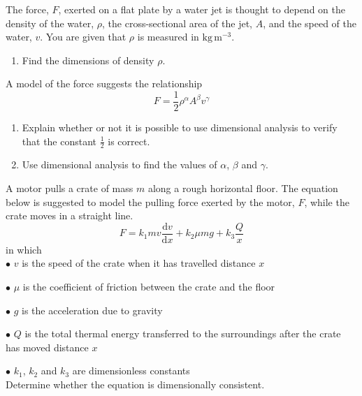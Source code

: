 \documentclass[leqno]{article}
\begin{document}
\begin{enumerate}[
  label=\textbf{\arabic*.},
  leftmargin=*,
  topsep=0pt,
  partopsep=0pt,
  parsep=0pt
]
The force, $F$, exerted on a flat plate by a water jet is thought to depend on the density of the water, $\rho$, the cross-sectional area of the jet, $A$, and the speed of the water, $v$. You are given that $\rho$ is measured in $\mathrm{kg\,m^{-3}}$. \\
\begin{enumerate}[label=\textbf{(\alph*)}]
  \item Find the dimensions of density $\rho$.  \\
\end{enumerate}
A model of the force suggests the relationship
\[
F = \frac12 \rho^\alpha A^\beta v^\gamma
\]
\begin{enumerate}[label=\textbf{(\alph*)}, resume]
  \item Explain whether or not it is possible to use dimensional analysis to verify that the constant $\frac12$ is correct.  \\
  \item Use dimensional analysis to find the values of $\alpha$, $\beta$ and $\gamma$.  \\
\end{enumerate}

\newpage

\questionitem

A motor pulls a crate of mass $m$ along a rough horizontal floor. The equation below is suggested to model the pulling force exerted by the motor, $F$, while the crate moves in a straight line.
\[
F = k_1 m v\dfrac{\mathrm{d}v}{\mathrm{d}x} + k_2 \mu mg + k_3 \dfrac{Q}{x}
\]
in which \\

$\bullet$ $v$ is the speed of the crate when it has travelled distance $x$

$\bullet$ $\mu$ is the coefficient of friction between the crate and the floor

$\bullet$ $g$ is the acceleration due to gravity

$\bullet$ $Q$ is the total thermal energy transferred to the surroundings after the crate has moved distance $x$

$\bullet$ $k_1$, $k_2$ and $k_3$ are dimensionless constants \\

Determine whether the equation is dimensionally consistent.  \\

\newpage



\end{enumerate}
\end{document}
